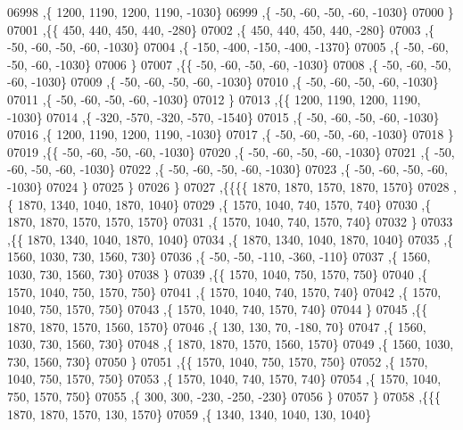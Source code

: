 \begin{DoxyCode}
06998     ,\{  1200,  1190,  1200,  1190, -1030\}
06999     ,\{   -50,   -60,   -50,   -60, -1030\}
07000     \}
07001    ,\{\{   450,   440,   450,   440,  -280\}
07002     ,\{   450,   440,   450,   440,  -280\}
07003     ,\{   -50,   -60,   -50,   -60, -1030\}
07004     ,\{  -150,  -400,  -150,  -400, -1370\}
07005     ,\{   -50,   -60,   -50,   -60, -1030\}
07006     \}
07007    ,\{\{   -50,   -60,   -50,   -60, -1030\}
07008     ,\{   -50,   -60,   -50,   -60, -1030\}
07009     ,\{   -50,   -60,   -50,   -60, -1030\}
07010     ,\{   -50,   -60,   -50,   -60, -1030\}
07011     ,\{   -50,   -60,   -50,   -60, -1030\}
07012     \}
07013    ,\{\{  1200,  1190,  1200,  1190, -1030\}
07014     ,\{  -320,  -570,  -320,  -570, -1540\}
07015     ,\{   -50,   -60,   -50,   -60, -1030\}
07016     ,\{  1200,  1190,  1200,  1190, -1030\}
07017     ,\{   -50,   -60,   -50,   -60, -1030\}
07018     \}
07019    ,\{\{   -50,   -60,   -50,   -60, -1030\}
07020     ,\{   -50,   -60,   -50,   -60, -1030\}
07021     ,\{   -50,   -60,   -50,   -60, -1030\}
07022     ,\{   -50,   -60,   -50,   -60, -1030\}
07023     ,\{   -50,   -60,   -50,   -60, -1030\}
07024     \}
07025    \}
07026   \}
07027  ,\{\{\{\{  1870,  1870,  1570,  1870,  1570\}
07028     ,\{  1870,  1340,  1040,  1870,  1040\}
07029     ,\{  1570,  1040,   740,  1570,   740\}
07030     ,\{  1870,  1870,  1570,  1570,  1570\}
07031     ,\{  1570,  1040,   740,  1570,   740\}
07032     \}
07033    ,\{\{  1870,  1340,  1040,  1870,  1040\}
07034     ,\{  1870,  1340,  1040,  1870,  1040\}
07035     ,\{  1560,  1030,   730,  1560,   730\}
07036     ,\{   -50,   -50,  -110,  -360,  -110\}
07037     ,\{  1560,  1030,   730,  1560,   730\}
07038     \}
07039    ,\{\{  1570,  1040,   750,  1570,   750\}
07040     ,\{  1570,  1040,   750,  1570,   750\}
07041     ,\{  1570,  1040,   740,  1570,   740\}
07042     ,\{  1570,  1040,   750,  1570,   750\}
07043     ,\{  1570,  1040,   740,  1570,   740\}
07044     \}
07045    ,\{\{  1870,  1870,  1570,  1560,  1570\}
07046     ,\{   130,   130,    70,  -180,    70\}
07047     ,\{  1560,  1030,   730,  1560,   730\}
07048     ,\{  1870,  1870,  1570,  1560,  1570\}
07049     ,\{  1560,  1030,   730,  1560,   730\}
07050     \}
07051    ,\{\{  1570,  1040,   750,  1570,   750\}
07052     ,\{  1570,  1040,   750,  1570,   750\}
07053     ,\{  1570,  1040,   740,  1570,   740\}
07054     ,\{  1570,  1040,   750,  1570,   750\}
07055     ,\{   300,   300,  -230,  -250,  -230\}
07056     \}
07057    \}
07058   ,\{\{\{  1870,  1870,  1570,   130,  1570\}
07059     ,\{  1340,  1340,  1040,   130,  1040\}

\end{DoxyCode}
